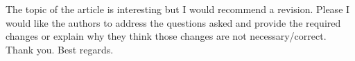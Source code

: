 \documentclass[a4paper,11pt,twoside]{article}
\begin{document}
The topic of the article is interesting but I would recommend a revision.  
Please I would like the authors to address the questions asked and provide the 
required changes or explain why they think those changes are not 
necessary/correct. Thank you. Best regards.\\
\end{document}
